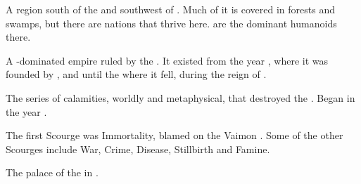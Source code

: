 \begin{gloss}
\begin{comment}
\paragraph{Uzur}
\end{comment}
A region south of the  and southwest of . 
Much of it is covered in  forests and swamps, but there are nations that thrive here. 
 are the dominant humanoids there. 









\begin{comment}
\paragraph{\VaimonCaliphate}
\end{comment}
\gitem{\VaimonCaliphate}
\index{\VaimonCaliphate}
A \human-dominated empire ruled by the . 
It existed from the year , where it was founded by , and until the  where it fell, during the reign of . 





\begin{subgloss}
  \begin{comment}
  \subparagraph{\HundredScourges}
  \end{comment}
  \gitem{\HundredScourges}
  The series of calamities, worldly and metaphysical, that destroyed the \VaimonCaliphate. 
  Began in the year . 
  
  The first Scourge was Immortality, blamed on the Vaimon \Calipha {}. 
  Some of the other Scourges include War, Crime, Disease, Stillbirth and Famine. 




  \begin{comment}
  \subparagraph{Rainbow Palace}
  \end{comment}
  The palace of the \VaimonCaliph in . 





\end{subgloss}
\end{gloss}
